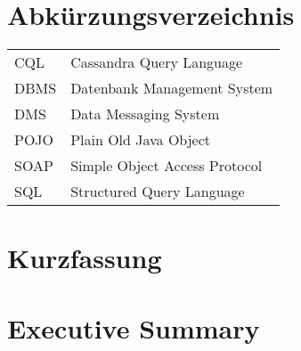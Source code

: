 
\chapter*{Abkürzungsverzeichnis}
\begin{table}[h]
	\label{my-label}
	\begin{tabular}{ll}
		CQL & Cassandra Query Language \\
		DBMS    & Datenbank Management System          \\
		DMS   & Data Messaging System \\
		POJO & Plain Old Java Object \\
		SOAP & Simple Object Access Protocol \\
		SQL & Structured Query Language
	\end{tabular}
\end{table}

\chapter*{Kurzfassung}


\chapter*{Executive Summary}



